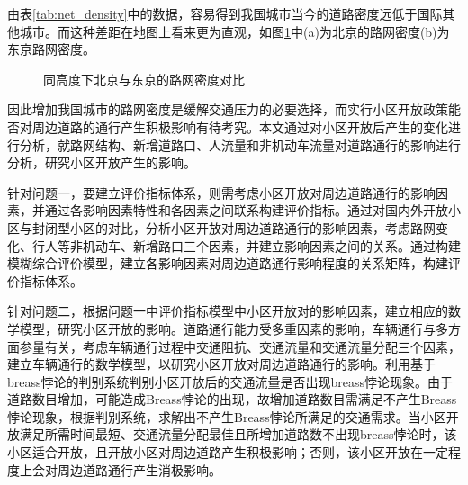 \documentclass[fontset=fandol,a4paper,12pt]{ctexart}
\begin{document}
  由表\ref{tab:net_density}中的数据，容易得到我国城市当今的道路密度远低于国际其他城市。而这种差距在地图上看来更为直观，如图\ref{fig:cmp_tokyo_beijing}中(a)为北京的路网密度(b)为东京路网密度。
  \begin{figure}[!htbp]
  	 \centering
	 \caption{同高度下北京与东京的路网密度对比}
	 \label{fig:cmp_tokyo_beijing}
  \end{figure}
  因此增加我国城市的路网密度是缓解交通压力的必要选择，而实行小区开放政策能否对周边道路的通行产生积极影响有待考究。本文通过对小区开放后产生的变化进行分析，就路网结构、新增道路口、人流量和非机动车流量对道路通行的影响进行分析，研究小区开放产生的影响。
  
	针对问题一，要建立评价指标体系，则需考虑小区开放对周边道路通行的影响因素，并通过各影响因素特性和各因素之间联系构建评价指标。通过对国内外开放小区与封闭型小区的对比，分析小区开放对周边道路通行的影响因素，考虑路网变化、行人等非机动车、新增路口三个因素，并建立影响因素之间的关系。通过构建模糊综合评价模型，建立各影响因素对周边道路通行影响程度的关系矩阵，构建评价指标体系。
	
	针对问题二，根据问题一中评价指标模型中小区开放对的影响因素，建立相应的数学模型，研究小区开放的影响。道路通行能力受多重因素的影响，车辆通行与多方面参量有关，考虑车辆通行过程中交通阻抗、交通流量和交通流量分配三个因素，建立车辆通行的数学模型，以研究小区开放对周边道路通行的影响。利用基于breass悖论的判别系统判别小区开放后的交通流量是否出现breass悖论现象。由于道路数目增加，可能造成Breass悖论的出现，故增加道路数目需满足不产生Breass悖论现象，根据判别系统，求解出不产生Breass悖论所满足的交通需求。当小区开放满足所需时间最短、交通流量分配最佳且所增加道路数不出现breass悖论时，该小区适合开放，且开放小区对周边道路产生积极影响；否则，该小区开放在一定程度上会对周边道路通行产生消极影响。  
	
\end{document}
